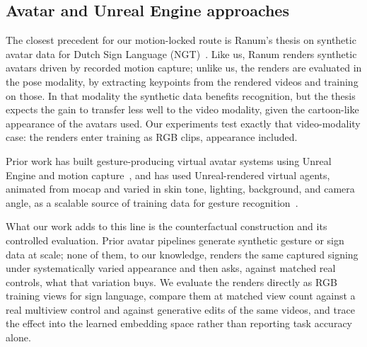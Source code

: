 \subsection{Avatar and Unreal Engine approaches}
The closest precedent for our motion-locked route is Ranum's thesis on
synthetic avatar data for Dutch Sign Language
(NGT)~\cite{ranum3DAwarenessGeometry2024}. Like us, Ranum renders
synthetic avatars driven by recorded motion capture; unlike us, the
renders are evaluated in the pose modality, by extracting keypoints from
the rendered videos and training on those. In that modality the
synthetic data benefits recognition, but the thesis expects the gain to
transfer less well to the video modality, given the cartoon-like
appearance of the avatars used. Our experiments test exactly that
video-modality case: the renders enter training as RGB clips, appearance
included. 

Prior work has built gesture-producing virtual avatar systems using Unreal
Engine and motion capture~\cite{messinaModularSignLanguage2025}, and has
used Unreal-rendered virtual agents, animated from mocap and varied in
skin tone, lighting, background, and camera angle, as a scalable source
of training data for gesture recognition~\cite{loyVirtualAgentsScalable}.

What our work adds to this line is the counterfactual construction and
its controlled evaluation. Prior avatar pipelines generate synthetic
gesture or sign data at scale; none of them, to our knowledge, renders
the same captured signing under systematically varied appearance and
then asks, against matched real controls, what that variation buys. We
evaluate the renders directly as RGB training views for sign language,
compare them at matched view count against a real multiview control and
against generative edits of the same videos, and trace the effect into
the learned embedding space rather than reporting task accuracy alone.
